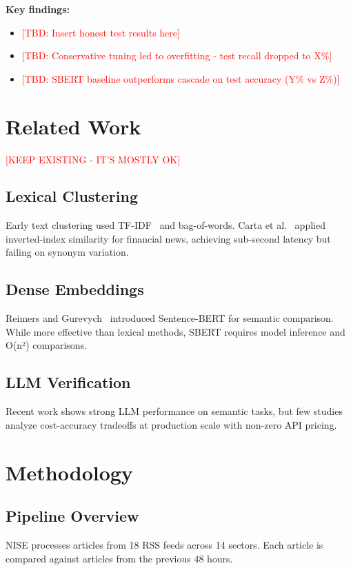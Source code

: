 \documentclass[conference]{IEEEtran}
\newcommand{\tbd}[1]{\textcolor{red}{[TBD: #1]}}
\begin{document}
\textbf{Key findings:}
\begin{itemize}
    \item \tbd{Insert honest test results here}
    \item \tbd{Conservative tuning led to overfitting - test recall dropped to X\%}
    \item \tbd{SBERT baseline outperforms cascade on test accuracy (Y\% vs Z\%)}
\end{itemize}

\section{Related Work}

\textcolor{red}{[KEEP EXISTING - IT'S MOSTLY OK]}

\subsection{Lexical Clustering}
Early text clustering used TF-IDF~\cite{salton1988} and bag-of-words.
Carta et al.~\cite{carta2022} applied inverted-index similarity for financial news, achieving sub-second latency but failing on synonym variation.

\subsection{Dense Embeddings}
Reimers and Gurevych~\cite{reimers2019sentence} introduced Sentence-BERT for semantic comparison.
While more effective than lexical methods, SBERT requires model inference and O(n²) comparisons.

\subsection{LLM Verification}
Recent work shows strong LLM performance on semantic tasks, but few studies analyze cost-accuracy tradeoffs at production scale with non-zero API pricing.

\section{Methodology}

\subsection{Pipeline Overview}
NISE processes articles from 18 RSS feeds across 14 sectors.
Each article is compared against articles from the previous 48 hours.
\end{document}
